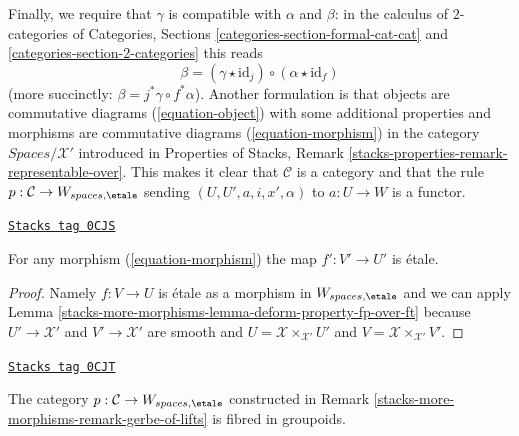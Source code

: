 \begin{remark}
\begin{equation}
{}
\end{equation}
Finally, we require that $\gamma$ is compatible with $\alpha$ and $\beta$:
in the calculus of $2$-categories of Categories, Sections
\ref{categories-section-formal-cat-cat} and
\ref{categories-section-2-categories} this reads
$$
\beta = (\gamma \star \text{id}_j) \circ (\alpha \star \text{id}_f)
$$
(more succinctly: $\beta = j^*\gamma \circ f^*\alpha$).
Another formulation is that objects are commutative diagrams
(\ref{equation-object}) with some additional properties and
morphisms are commutative diagrams
(\ref{equation-morphism}) in the category $\textit{Spaces}/\mathcal{X}'$
introduced in Properties of Stacks, Remark
\ref{stacks-properties-remark-representable-over}.
This makes it clear that $\mathcal{C}$ is a category
and that the rule $p : \mathcal{C} \to W_{spaces, \etale}$
sending $(U, U', a, i, x', \alpha)$ to $a : U \to W$
is a functor.
\end{remark}

\begin{lemma}
\label{stacks-more-morphisms-lemma-morphisms-lifts-etale}
\href{https://stacks.math.columbia.edu/tag/0CJS}{\texttt{Stacks tag 0CJS}}

For any morphism (\ref{equation-morphism}) the map $f' : V' \to U'$ is \'etale.
\end{lemma}

\begin{proof}
Namely $f : V \to U$ is \'etale as a morphism in $W_{spaces, \etale}$
and we can apply
Lemma \ref{stacks-more-morphisms-lemma-deform-property-fp-over-ft} because $U' \to \mathcal{X}'$
and $V' \to \mathcal{X}'$ are smooth and
$U = \mathcal{X} \times_{\mathcal{X}'} U'$ and
$V = \mathcal{X} \times_{\mathcal{X}'} V'$.
\end{proof}

\begin{lemma}
\label{stacks-more-morphisms-lemma-gerbe-of-lifts-fibred}
\href{https://stacks.math.columbia.edu/tag/0CJT}{\texttt{Stacks tag 0CJT}}

The category $p : \mathcal{C} \to W_{spaces, \etale}$ constructed
in Remark \ref{stacks-more-morphisms-remark-gerbe-of-lifts} is fibred in groupoids.
\end{lemma}


